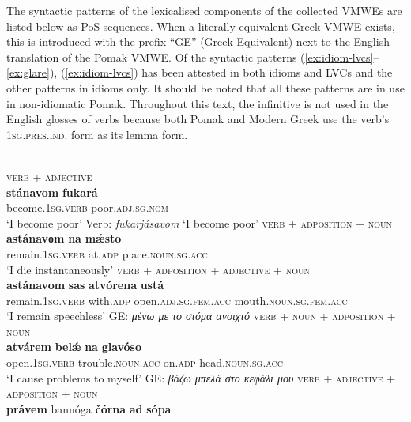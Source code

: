 \documentclass[output=paper,colorlinks,citecolor=brown]{langscibook}
\begin{document}
The syntactic patterns of the lexicalised components of the collected VMWEs are listed below as PoS sequences.  When a literally equivalent Greek  VMWE exists, this is introduced with the prefix “GE” (Greek Equivalent) next to the English translation of the Pomak VMWE.  Of the syntactic patterns (\ref{ex:idiom-lvcs}--\ref{ex:glare}), (\ref{ex:idiom-lvcs}) has been attested in both idioms and LVCs and the other patterns in idioms only. It should be noted that all these patterns are in use in non-idiomatic Pomak. Throughout this text, the infinitive is not used in the English glosses of verbs because both Pomak and Modern Greek use the verb's  \textsc{1sg.pres.ind.} form as its lemma form.\pagebreak

\ea
\label{ex:idiom-lvcs}
 \\ 
\ex
\label{ex:copula}
 \textsc{verb} + \textsc{adjective} \\
\gll \textbf{{stánavom}} \textbf{{fukará}}\\
{become}.\textsc{1sg.verb} poor.\textsc{adj.sg.nom} \\
\glt `Ι become poor' Verb: \textit{fukarjásavom} `Ι become poor'
\ex
\textsc{verb} + \textsc{adposition} + \textsc{noun}\\
\gll \textbf{{astánavοm}} \textbf{{na}} \textbf{{mǽsto}}\\
{remain}.\textsc{1sg.verb} at.\textsc{adp}  place.\textsc{noun.sg.acc}\\
\glt `I die instantaneously'
\ex
\textsc{verb} + \textsc{adposition} + \textsc{adjective} + \textsc{noun}\\
\gll \textbf{{astánavom}} \textbf{{sas}} \textbf{{atvórena}} \textbf{{ustá}} \\
{remain}.\textsc{1sg.verb} with.\textsc{adp}  open.\textsc{adj.sg.fem.acc} mouth.\textsc{noun.sg.fem.acc}\\
\glt `I remain speechless' GE: \textit{μένω με το στόμα ανοιχτό}
\ex
\textsc{verb} + \textsc{noun} + \textsc{adposition} + \textsc{noun}\\
\gll \textbf{{atvárem}} \textbf{{belǽ}} \textbf{{na}} \textbf{{glavóso}}\\
{open}.\textsc{1sg.verb} trouble.\textsc{noun.acc} on.\textsc{adp}  head.\textsc{noun.sg.acc}\\
\glt `I cause problems to myself' GE: \textit{βάζω μπελά στο κεφάλι μου}
\ex
\textsc{verb}  + \textsc{adjective} + \textsc{adposition} + \textsc{noun}\\
\gll \textbf{{právem}} bannóga \textbf{{čórna}} \textbf{{ad}} \textbf{{sópa}}\\
\end{document}
